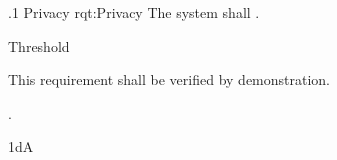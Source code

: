 \ONERQMTV
{\RqtNumberBase.1}
{Privacy}
{rqt:Privacy}
{The system shall \TBD.}
{
	\item [Phase 1] Threshold
}
{This requirement shall be verified by demonstration.}
{
	\item [\cite{ref__BDP_FOS_CDD}] \TBD
}
{
	\item \TBD.
}
{1dA}

